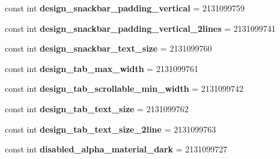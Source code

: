 \begin{DoxyCompactItemize}
const int {\bfseries design\+\_\+snackbar\+\_\+padding\+\_\+vertical} = 2131099759
\item 
\mbox{\label{class_pinned_app_1_1_droid_1_1_resource_1_1_dimension_a7156e19a856040126b403bb30c5b7cc3}} 
const int {\bfseries design\+\_\+snackbar\+\_\+padding\+\_\+vertical\+\_\+2lines} = 2131099741
\item 
\mbox{\label{class_pinned_app_1_1_droid_1_1_resource_1_1_dimension_a129e0d56a97841ee656bc8f88cbcfc35}} 
const int {\bfseries design\+\_\+snackbar\+\_\+text\+\_\+size} = 2131099760
\item 
\mbox{\label{class_pinned_app_1_1_droid_1_1_resource_1_1_dimension_a5cd1c25ecc43a3e6c944210b50f66a3d}} 
const int {\bfseries design\+\_\+tab\+\_\+max\+\_\+width} = 2131099761
\item 
\mbox{\label{class_pinned_app_1_1_droid_1_1_resource_1_1_dimension_a2cbb42f3f31f67cf7338f26b3062c8d4}} 
const int {\bfseries design\+\_\+tab\+\_\+scrollable\+\_\+min\+\_\+width} = 2131099742
\item 
\mbox{\label{class_pinned_app_1_1_droid_1_1_resource_1_1_dimension_ac6b9675afb454c54d8c939f24c8f63c9}} 
const int {\bfseries design\+\_\+tab\+\_\+text\+\_\+size} = 2131099762
\item 
\mbox{\label{class_pinned_app_1_1_droid_1_1_resource_1_1_dimension_a66a6f4f44f2676d8b26ee87c5955d551}} 
const int {\bfseries design\+\_\+tab\+\_\+text\+\_\+size\+\_\+2line} = 2131099763
\item 
\mbox{\label{class_pinned_app_1_1_droid_1_1_resource_1_1_dimension_a18e9ed3edea10410a316de29c2242de5}} 
const int {\bfseries disabled\+\_\+alpha\+\_\+material\+\_\+dark} = 2131099727
\item 
\mbox{\label{class_pinned_app_1_1_droid_1_1_resource_1_1_dimension_aa3fb3fe52b0d2c80809e1ac43e534ce1}} 

\end{DoxyCompactItemize}
